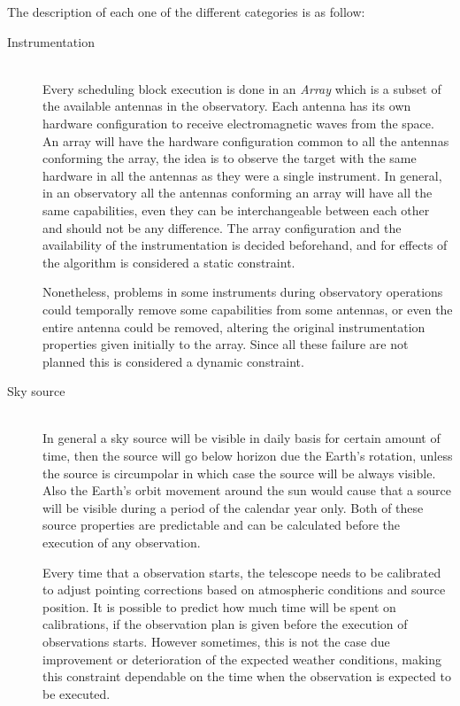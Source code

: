 The description of each one of the different categories is as follow:

\begin{description}
    \item[Instrumentation] \hfill \\
Every scheduling block execution is done in an \textit{Array} which is a subset of the available antennas in the observatory. Each antenna has its own hardware configuration to receive electromagnetic waves from the space. An array will have the hardware configuration common to all the antennas conforming the array, the idea is to observe the target with the same hardware in all the antennas as they were a single instrument. In general, in an observatory all the antennas conforming an array will have all the same capabilities, even they can be interchangeable between each other and should not be any difference. The array configuration and the availability of the instrumentation is decided beforehand, and for effects of the algorithm is considered a static constraint. 

Nonetheless, problems in some instruments during observatory operations could temporally remove some capabilities from some antennas, or even the entire antenna could be removed, altering the original instrumentation properties given initially to the array. Since all these failure are not planned this is considered a dynamic constraint.

	\item[Sky source] \hfill \\
In general a sky source will be visible in daily basis for certain amount of time, then the source will go below horizon due the Earth's rotation, unless the source is circumpolar in which case the source will be always visible. Also the Earth's orbit movement around the sun would cause that a source will be visible during a period of the calendar year only. Both of these source properties are predictable and can be calculated before the execution of any observation.

Every time that a observation starts, the telescope needs to be calibrated to adjust pointing corrections based on atmospheric conditions and source position. It is possible to predict how much time will be spent on calibrations, if the observation plan is given before the execution of observations starts. However sometimes, this is not the case due improvement or deterioration of the expected weather conditions,  making this constraint dependable on the time when the observation is expected to be executed.
  

\end{description}
